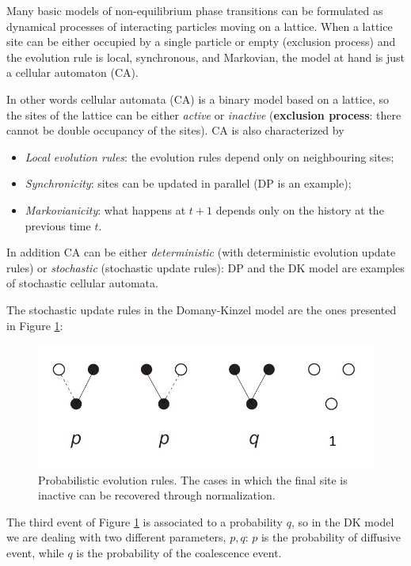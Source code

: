 \documentclass[\main/main.tex]{subfiles}
\begin{document}
Many basic models of non-equilibrium phase transitions can be formulated as dynamical processes of interacting particles moving on a lattice. When a lattice site can be either occupied by a single particle or empty (exclusion process) and the evolution rule is local, synchronous, and Markovian, the model at hand is just a cellular automaton (CA).

In other words cellular automata (CA) is a binary model based on a lattice, so the sites of the lattice can be either \textit{active} or \textit{inactive} (\textbf{exclusion process}: there cannot be double occupancy of the sites).
CA is also characterized by 
\begin{itemize}
    \item \textit{Local evolution rules}: the evolution rules depend only on neighbouring sites;
    \item \textit{Synchronicity}: sites can be updated in parallel (DP is an example);
    \item \textit{Markovianicity}: what happens at $t+1$ depends only on the history at the previous time $t$.
\end{itemize}

In addition CA can be either \textit{deterministic} (with deterministic evolution update rules) or \textit{stochastic} (stochastic update rules): DP and the DK model are examples of stochastic cellular automata.

The stochastic update rules in the Domany-Kinzel model are the ones presented in Figure \ref{fig:stoch_rules}:

\begin{figure}[ht]
    \centering
    \includegraphics[width=0.8\linewidth]{Lectures/Images/stoch_rules.jpg}
    \caption{Probabilistic evolution rules. The cases in which the final site is inactive can be recovered through normalization.}
    \label{fig:stoch_rules}
\end{figure}

The third event of Figure \ref{fig:stoch_rules} is associated to a probability $q$, so in the DK model we are dealing with two different parameters, $p,q$: $p$ is the probability of diffusive event, while $q$ is the probability of the coalescence event. \\
\end{document}
